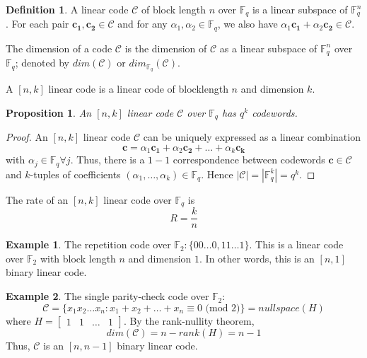 \documentclass[12pt, oneside]{book}
\newtheorem{proposition}[theorem]{Proposition}
\theoremstyle{definition}
\newtheorem{definition}{Definition}[section]
\theoremstyle{definition}
\newtheorem{example}{Example}[section]
\theoremstyle{remark}
\begin{document}
\begin{definition}
    A linear code $\mathcal{C}$ of block length $n$ over $\mathbb{F}_q$ is a linear subspace of $\mathbb{F}_q^n$. For each pair $\mathbf{c_1},\mathbf{c_2}\in \mathcal{C}$ and for any $\alpha_1,\alpha_2 \in \mathbb{F}_q$, we also have $\alpha_1\mathbf{c_1}+\alpha_2\mathbf{c_2}\in\mathcal{C}$.
\end{definition}
The dimension of a code $\mathcal{C}$ is the dimension of $\mathcal{C}$ as a linear subspace of $\mathbb{F}_q^n$ over $\mathbb{F}_q$; denoted by $dim(\mathcal{C})$ or $dim_{\mathbb{F}_q}(\mathcal{C})$.

A $[n,k]$ linear code is a linear code of blocklength $n$ and dimension $k$.

\begin{proposition}
An $[n,k]$ linear code $\mathcal{C}$ over $\mathbb{F}_q$ has $q^k$ codewords.
\end{proposition}
\begin{proof}
    An $[n,k]$ linear code $\mathcal{C}$ can be uniquely expressed as a linear combination
    \[
    \mathbf{c}=\alpha_1\mathbf{c_1}+\alpha_2\mathbf{c_2}+\ldots+\alpha_k\mathbf{c_k}
    \]
    with $\alpha_j\in\mathbb{F}_q \forall j$. Thus, there is a $1-1$ correspondence between codewords $\mathbf{c}\in\mathcal{C}$ and $k$-tuples of coefficients $(\alpha_1,\ldots,\alpha_k)\in\mathbb{F}_q$. Hence $|\mathcal{C}|=|\mathbb{F}_q^k|=q^k$.
\end{proof}
The rate of an $[n,k]$ linear code over $\mathbb{F}_q$ is
\[
R=\frac{k}{n}
\]

\begin{example}
    The repetition code over $\mathbb{F}_2:\{00\ldots0,11\ldots1\}$. This is a linear code over $\mathbb{F}_2$ with block length $n$ and dimension $1$. In other words, this is an $[n,1]$ binary linear code.
\end{example}

\begin{example}
    The single parity-check code over $\mathbb{F}_2$:
    \[
    \mathcal{C}=\{x_1x_2\ldots x_n: x_1+x_2+\ldots+x_n\equiv 0 \text{ (mod 2)}\}=nullspace(H)
    \]
    where $H=\begin{bmatrix}
        1 &1 & \ldots & 1 
    \end{bmatrix}$. By the rank-nullity theorem,
    \[
    dim(\mathcal{C})=n-rank(H)=n-1
    \]
    Thus, $\mathcal{C}$ is an $[n,n-1]$ binary linear code.
\end{example}
\end{document}

